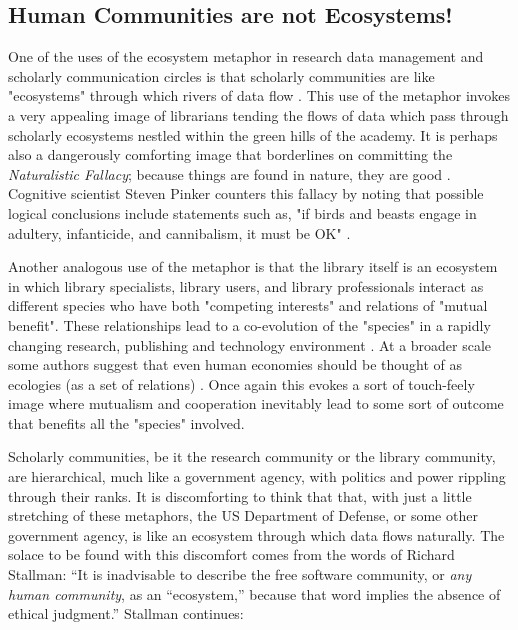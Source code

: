 \subsection{Human Communities are not Ecosystems!}

One of the uses of the ecosystem metaphor in research data management and scholarly communication circles is that scholarly communities are like "ecosystems" through which rivers of data flow \citep{choudhury_2010}. This use of the metaphor invokes a very appealing image of librarians tending the flows of data which pass through scholarly ecosystems nestled within the green hills of the academy. It is perhaps also a dangerously comforting image that borderlines on committing the \textit{Naturalistic Fallacy}; because things are found in nature, they are good \citep[see][p. 68 for a similar example in business management]{lucas_2012}. Cognitive scientist Steven Pinker counters this fallacy by noting that possible logical conclusions include statements such as, "if birds and beasts engage in adultery, infanticide, and cannibalism, it must be OK" \citep{pinker_2002}. 

Another analogous use of the metaphor is that the library itself is an ecosystem in which library specialists, library users, and library professionals interact as different species who have both "competing interests" and relations of "mutual benefit". These relationships lead to a co-evolution of the "species" in a rapidly changing research, publishing and technology environment \citep{walter_2008}. At a broader scale some authors suggest that even human economies should be thought of as ecologies (as a set of relations) \citep[][p. 72]{lucas_2012}. Once again this evokes a sort of touch-feely image where mutualism and cooperation inevitably lead to some sort of outcome that benefits all the "species" involved. 

Scholarly communities, be it the research community or the library community, are hierarchical, much like a government agency, with politics and power rippling through their ranks. It is discomforting to think that that, with just a little stretching of these metaphors, the US Department of Defense, or some other government agency, is like an ecosystem through which data flows naturally. The solace to be found with this discomfort comes from the words of Richard Stallman: “It is inadvisable to describe the free software community, or \textit{any human community}, as an “ecosystem,” because that word implies the absence of ethical judgment.”  Stallman continues:
 
